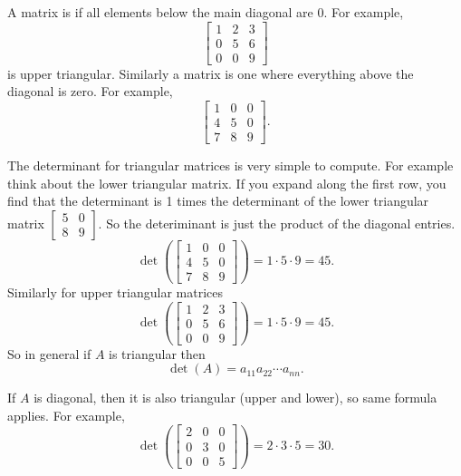 A matrix is \emph{} if all elements below
the main diagonal are 0.  For example,
\begin{equation*}
\begin{bmatrix}
1 & 2 & 3 \\
0 & 5 & 6 \\
0 & 0 & 9
\end{bmatrix}
\end{equation*}
is upper triangular.  Similarly a \emph{}
matrix is one where everything above the diagonal is zero.  For example,
\begin{equation*}
\begin{bmatrix}
1 & 0 & 0 \\
4 & 5 & 0 \\
7 & 8 & 9
\end{bmatrix} .
\end{equation*}

The determinant for triangular matrices is very simple to compute.  For
example think about the lower triangular matrix.  If you expand along the
first row, you find that the determinant is 1 times the determinant
of the lower triangular matrix $\left[ \begin{smallmatrix} 5 & 0 \\ 8 & 9
\end{smallmatrix} \right]$.  So the deteriminant is just the
product of the diagonal entries.
\begin{equation*}
\det \left(
\begin{bmatrix}
1 & 0 & 0 \\
4 & 5 & 0 \\
7 & 8 & 9
\end{bmatrix} 
\right)
=
1 \cdot 5 \cdot 9 = 45 .
\end{equation*}
Similarly for upper triangular matrices
\begin{equation*}
\det \left(
\begin{bmatrix}
1 & 2 & 3 \\
0 & 5 & 6 \\
0 & 0 & 9
\end{bmatrix}
\right)
=
1 \cdot 5 \cdot 9 = 45 .
\end{equation*}
So in general if $A$ is triangular then
\begin{equation*}
\det (A) = a_{11} a_{22} \cdots a_{nn} .
\end{equation*}

If $A$ is diagonal, then it is also triangular (upper and lower), so
same formula applies.  For example,
\begin{equation*}
\det \left(
\begin{bmatrix}
2 & 0 & 0 \\
0 & 3 & 0 \\
0 & 0 & 5
\end{bmatrix}
\right)
=
2 \cdot 3 \cdot 5 = 30 .
\end{equation*}

